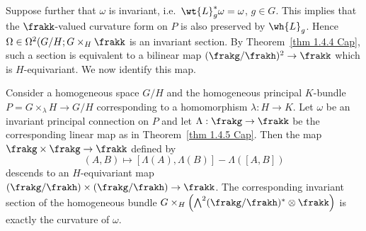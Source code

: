 Suppose further that $\omega$ is invariant, i.e.\ $\wt{L}_g^\ast \omega=\omega$, $g\in G$. This implies that the $\frakk$-valued curvature form on $P$ is also preserved by $\wh{L}_g$. Hence $\Omega\in\Omega^2(G\slash H;G\times_H \frakk$ is an invariant section. By Theorem~\ref{thm 1.4.4 Cap}, such a section is equivalent to a bilinear map $(\frakg\slash\frakh)^2\to\frakk$ which is $H$-equivariant. We now identify this map.
\begin{prop}\label{prop 1.4.6 Cap}
    Consider a homogeneous space $G\slash H$ and the homogeneous principal $K$-bundle $P=G\times_\lambda H\to G\slash H$ corresponding to a homomorphism $\lambda:H\to K$. Let $\omega$ be an invariant principal connection on $P$ and let $\Lambda:\frakg\to \frakk$ be the corresponding linear map as in Theorem~\ref{thm 1.4.5 Cap}. Then the map $\frakg\times\frakg\to\frakk$ defined by 
    \[(A,B)\mapsto [\Lambda(A),\Lambda(B)]-\Lambda([A,B])\]
    descends to an $H$-equivariant map $(\frakg\slash\frakh)\times(\frakg\slash\frakh)\to \frakk$. The corresponding invariant section of the homogeneous bundle $G\times_H \left(\bigwedge^2(\frakg\slash\frakh)^\ast\otimes\frakk\right)$ is exactly the curvature of $\omega$.
\end{prop}
